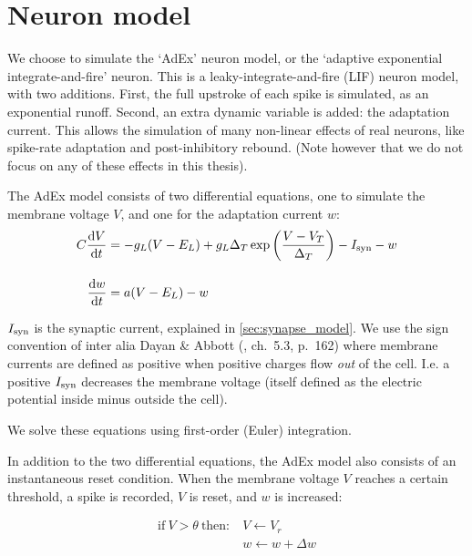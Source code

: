 
\section{Neuron model}

We choose to simulate the `AdEx' neuron model, or the `adaptive exponential integrate-and-fire' neuron.\cite{Gerstner2009AdaptiveExponentialIntegrateandfire}
This is a leaky-integrate-and-fire (LIF) neuron model, with two additions.
First, the full upstroke of each spike is simulated, as an exponential runoff.
Second, an extra dynamic variable is added: the adaptation current.
This allows the simulation of many non-linear effects of real neurons, like spike-rate adaptation and post-inhibitory rebound. (Note however that we do not focus on any of these effects in this thesis).

The AdEx model consists of two differential equations, one to simulate the membrane voltage $V$, and one for the adaptation current $w$:
\begin{align}
    C \frac{\mathrm{d}V}{\mathrm{d}t} &=  -g_L (V - E_L)
                            + g_L \Delta_T \exp \left(\frac{V-V_T}{\Delta_T}  \right)
                            - I_{\text{syn}} - w
                            \label{eq:AdEx-V}
                            \\[1em]
    \frac{\mathrm{d}w}{\mathrm{d}t} &= a (V - E_L) - w
        \label{eq:AdEx-w}
\end{align}

$I_{\text{syn}}$ is the synaptic current, explained in \cref{sec:synapse_model}.
We use the sign convention of inter alia Dayan \& Abbott (\cite{Dayan2001TheoreticalNeuroscienceComputational}, ch.~5.3, p.~162) where membrane currents are defined as positive when positive charges flow \emph{out} of the cell. I.e. a positive $I_{\text{syn}}$ decreases the membrane voltage (itself defined as the electric potential inside minus outside the cell).

We solve these equations using first-order (Euler) integration.

In addition to the two differential equations, the AdEx model also consists of an instantaneous reset condition. When the membrane voltage $V$ reaches a certain threshold, a spike is recorded, $V$ is reset, and $w$ is increased:

\begin{align}
    \text{if}\ V > \theta\ \text{then:}\
    & V \leftarrow V_r \\
    & w \leftarrow w + \Delta w
    \label{eq:AdEx-reset}
\end{align}



